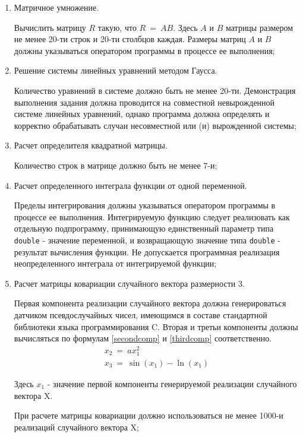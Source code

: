 
\begin{enumerate}

	\item Матричное умножение.
	
		Вычислить матрицу $R$ такую, что $R ~=~ AB$. Здесь $A$ и $B$ матрицы размером не менее 20-ти строк и 20-ти столбцов каждая. Размеры матриц $A$ и $B$ должны указываться оператором программы в процессе ее выполнения;

	\item Решение системы линейных уравнений методом Гаусса.

		Количество уравнений в системе должно быть не менее 20-ти. Демонстрация выполнения задания должна проводится на совместной невырожденной системе линейных уравнений, однако программа должна определять и корректно обрабатывать случаи несовместной или (и) вырожденной системы;

	\item Расчет определителя квадратной матрицы.

		Количество строк в матрице должно быть не менее 7-и;

	\item Расчет определенного интеграла функции от одной переменной.

		Пределы интегрирования должны указываться оператором программы в процессе ее выполнения. Интегрируемую функцию следует реализовать как отдельную подпрограмму, принимающую единственный параметр типа \verb|double| - значение переменной, и возвращающую значение типа \verb|double| - результат вычисления функции. Не допускается программная реализация неопределенного интеграла от интегрируемой функции;

	\item Расчет матрицы ковариации случайного вектора размерности 3.

		Первая компонента реализации случайного вектора должна генерироваться датчиком псевдослучайных чисел, имеющимся в составе стандартной библиотеки языка программирования C. Вторая и третьи компоненты должны вычисляться по формулам \eqref{secondcomp} и \eqref{thirdcomp} соответственно.
		\begin{gather}
			x_2 ~=~ a x_1^2 \label{secondcomp} \\
			x_3 ~=~ \sin(x_1) - \ln(x_1) \label{thirdcomp}
		\end{gather}

		Здесь $x_1$ - значение первой компоненты генерируемой реализации случайного вектора X.

		При расчете матрицы ковариации должно использоваться не менее 1000-и реализаций случайного вектора X;


\end{enumerate}
